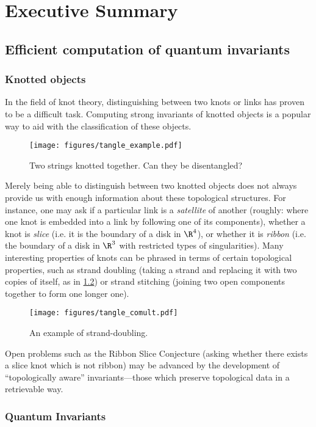 \chapter{Executive Summary}
\label{ch:summary}

\section{Efficient computation of quantum invariants}
\subsection{Knotted objects}
In the field of knot theory, distinguishing between two knots or links
has proven to be a difficult task. Computing strong invariants of knotted
objects is a popular way to aid with the classification of these objects.
\begin{figure}[h]
        \centering
        \texttt{[image: figures/tangle\_example.pdf]}
        \caption{Two strings knotted together. Can they be disentangled?}
        \label{fig:unknot}
\end{figure}

Merely being able to distinguish between two knotted objects does not always
provide us with enough information about these topological structures. For
instance, one may ask if a particular link is a \emph{satellite} of another
(roughly: where one knot is embedded into a link by following one of its
components), whether a knot is \emph{slice} (i.e. it is the boundary of a disk in
$\R^4$), or whether it is \emph{ribbon} (i.e. the boundary of a disk in $\R^3$
with restricted types of singularities). Many interesting properties of knots
can be phrased in terms of certain topological properties, such as strand
doubling (taking a strand and replacing it with two copies of itself, as in
\cref{fig:strand_double}) or strand stitching (joining two open components
together to form one longer one).
\begin{figure}[h]
        \centering
        \texttt{[image: figures/tangle\_comult.pdf]}
        \caption{An example of strand-doubling.}
        \label{fig:strand_double}
\end{figure}

Open problems such as the Ribbon Slice Conjecture (asking whether there exists a
slice knot which is not ribbon) may be advanced by the development of
\enquote{topologically aware} invariants---those which preserve topological data
in a retrievable way.

\subsection{Quantum Invariants}

